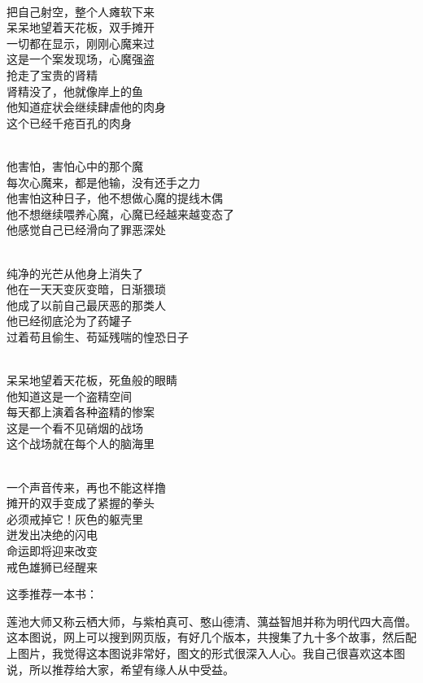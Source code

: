 \begin{poem}[盗精空间]
    \begin{multicols}{2}
        \begin{center}~\\
            把自己射空，整个人瘫软下来 \\ 呆呆地望着天花板，双手摊开 \\ 一切都在显示，刚刚心魔来过 \\ 这是一个案发现场，心魔强盗 \\ 抢走了宝贵的肾精 \\ 肾精没了，他就像岸上的鱼 \\ 他知道症状会继续肆虐他的肉身 \\ 这个已经千疮百孔的肉身

            ~\\

            他害怕，害怕心中的那个魔 \\ 每次心魔来，都是他输，没有还手之力 \\ 他害怕这种日子，他不想做心魔的提线木偶 \\ 他不想继续喂养心魔，心魔已经越来越变态了 \\ 他感觉自己已经滑向了罪恶深处

            ~\\

            纯净的光芒从他身上消失了 \\ 他在一天天变灰变暗，日渐猥琐 \\ 他成了以前自己最厌恶的那类人 \\ 他已经彻底沦为了药罐子 \\ 过着苟且偷生、苟延残喘的惶恐日子

            ~\\

            呆呆地望着天花板，死鱼般的眼睛 \\ 他知道这是一个盗精空间 \\ 每天都上演着各种盗精的惨案 \\ 这是一个看不见硝烟的战场 \\ 这个战场就在每个人的脑海里

            ~\\

            一个声音传来，再也不能这样撸 \\ 摊开的双手变成了紧握的拳头 \\ 必须戒掉它！灰色的躯壳里 \\ 迸发出决绝的闪电 \\ 命运即将迎来改变 \\ 戒色雄狮已经醒来
        \end{center}
    \end{multicols}
\end{poem}

这季推荐一本书：

\begin{book}[莲池大师戒杀放生文图说]
    莲池大师又称云栖大师，与紫柏真可、憨山德清、蕅益智旭并称为明代四大高僧。这本图说，网上可以搜到网页版，有好几个版本，共搜集了九十多个故事，然后配上图片，我觉得这本图说非常好，图文的形式很深入人心。我自己很喜欢这本图说，所以推荐给大家，希望有缘人从中受益。
\end{book}
